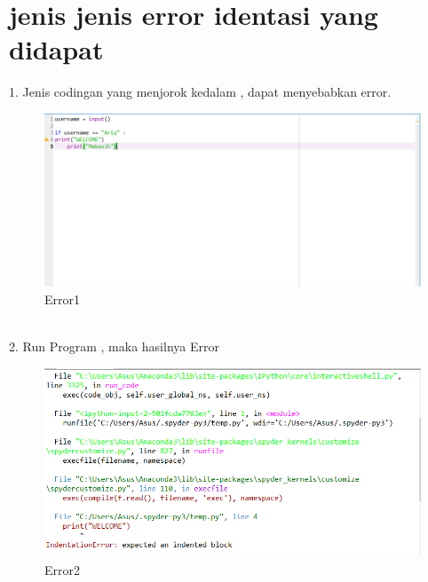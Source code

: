 \documentclass[12pt, times new roman, a4paper]{article}
\begin{document}
\section{jenis jenis error identasi yang didapat}
1. Jenis codingan yang menjorok kedalam , dapat menyebabkan error.\\
\begin{figure}[h]
	\centering
		\includegraphics[scale=0.4]{Gambar/E1}
	\caption{Error1}
\end{figure}
\\
2. Run Program , maka hasilnya 	Error\\
\begin{figure}[h]
	\centering
		\includegraphics[scale=0.5]{Gambar/E2}
	\caption{Error2}
\end{figure}
\\
\end{document}

